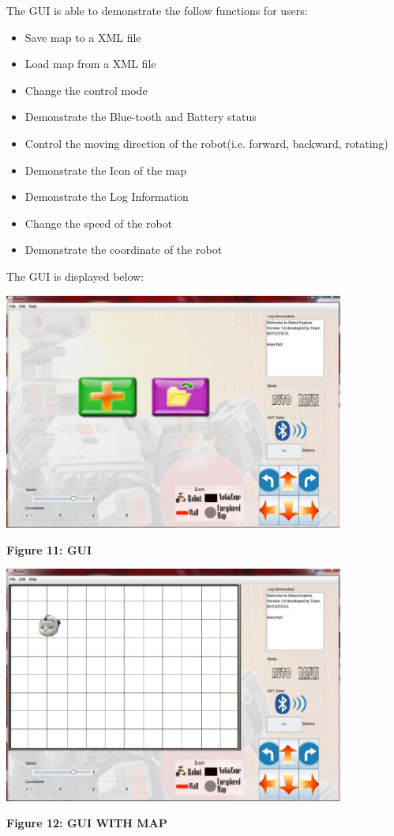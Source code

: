 \documentclass[11pt, a4paper]{report}
\begin{document}
The GUI is able to demonstrate the follow functions for users:
\begin{itemize}
\item Save map to a XML file
\item Load map from a XML file
\item Change the control mode
\item Demonstrate the Blue-tooth and Battery status
\item Control the moving direction of the robot(i.e. forward, backward, rotating)
\item Demonstrate the Icon of the map
\item Demonstrate the Log Information
\item Change the speed of the robot
\item Demonstrate the coordinate of the robot
\end{itemize}
The GUI is displayed below:
\pagebreak
\begin{center}
 \includegraphics[width=11.20cm]{GUI.jpg}
\end{center}
\begin{center}
\textbf {Figure 11: GUI} \\[0.3cm]
\end{center}
\begin{center}
 \includegraphics[width=11.20cm]{GUI2.jpg}
\end{center}
\begin{center}
\textbf {Figure 12: GUI WITH MAP} \\[0.3cm]
\end{center}
\end{document}
